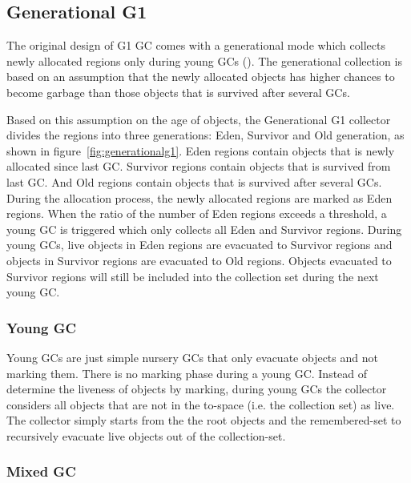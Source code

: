 \subsection{Generational G1}

The original design of G1 GC comes with a generational mode which collects newly allocated regions only during young GCs (\cite{detlefs2004garbage}).
The generational collection is based on an assumption that the newly allocated objects
has higher chances to become garbage than those objects that is survived after several GCs.

Based on this assumption on the age of objects, the Generational G1 collector divides the regions into three generations: Eden, Survivor and Old generation,
as shown in figure~\ref{fig:generationalg1}.
Eden regions contain objects that is newly allocated since last GC.
Survivor regions contain objects that is survived from last GC.
And Old regions contain objects that is survived after several GCs.
During the allocation process, the newly allocated regions are marked as Eden regions.
When the ratio of the number of Eden regions exceeds a  threshold,
a young GC is triggered which only collects all Eden and Survivor regions.
During young GCs, live objects in Eden regions are evacuated to Survivor regions
and objects in Survivor regions are evacuated to Old regions.
Objects evacuated to Survivor regions will still be included into the collection set during the next young GC.

\begin{figure*}
  \centering
  \texttt{[image: \{figs/generational.png]}}
  \caption{Generational G1 Heap Structure}
  \label{fig:generationalg1}
\end{figure*}

\subsubsection{Young GC}

Young GCs are just simple nursery GCs that only evacuate objects and not marking them.
There is no marking phase during a young GC. Instead of determine the liveness of objects
by marking, during young GCs the collector considers all objects that are not in the
to-space (i.e. the collection set) as live. The collector simply starts from the the root
objects and the remembered-set to recursively evacuate live objects out of the collection-set.

\subsubsection{Mixed GC}

